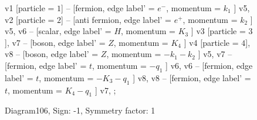 \documentclass{revtex4}
\begin{document}
\begin{figure}[!htb]
\begin{center}
{    %
v1 [particle = \(1\)] -- [fermion, edge label' = \(e^{-}\), momentum = \(k_{1}\) ] v5, 
v2 [particle = \(2\)] -- [anti fermion, edge label' = \(e^{+}\), momentum = \(k_{2}\) ] v5, 
v6 -- [scalar, edge label' = \(H\), momentum = \(K_{3}\) ] v3 [particle = \(3\)], 
v7 -- [boson, edge label' = \(Z\), momentum = \(K_{4}\) ] v4 [particle = \(4\)], 
v8 -- [boson, edge label' = \(Z\), momentum = \(-k_{1} - k_{2}\) ] v5, 
v7 -- [fermion, edge label' = \(t\), momentum = \(-q_{1}\) ] v6, 
v6 -- [fermion, edge label' = \(t\), momentum = \(-K_{3} - q_{1}\) ] v8, 
v8 -- [fermion, edge label' = \(t\), momentum = \(K_{4} - q_{1}\) ] v7, 
};
\end{center}
\caption{Diagram106, Sign: -1, Symmetry factor: 1}
\end{figure}
\newpage
\end{document}
